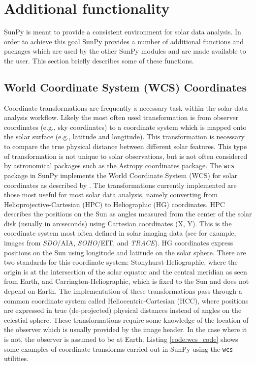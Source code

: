 \section{Additional functionality}\label{sec:util}
SunPy is meant to provide a consistent environment for solar data analysis. In 
order to achieve this goal SunPy provides a number of additional functions and packages which 
are used by the other SunPy modules and are made available to the user. This section 
briefly describes some of these functions.

	
\subsection{World Coordinate System (WCS) Coordinates}\label{ssec:util:wcs}
Coordinate transformations are frequently a necessary task within the solar 
data analysis workflow. Likely the most often used transformation is from 
observer coordinates (e.g., sky coordinates) to a coordinate system which is 
mapped onto the solar surface (e.g., latitude and longitude). This 
transformation is necessary to compare the true physical distance between 
different solar features. This type of transformation is not unique
to solar observations, but is not often considered by astronomical packages
such as the Astropy 
coordinates package. The \texttt{wcs} package in SunPy implements the World Coordinate 
System (WCS) for solar coordinates as described by \citep{thompson2006}. The 
transformations currently implemented are those most useful 
for most solar data analysis, namely converting from Helioprojective-Cartesian 
(HPC) to Heliographic (HG) coordinates. HPC describes the positions on 
the Sun as angles measured from the center of the solar disk (usually in 
arcseconds) using Cartesian coordinates (X, Y). This is the coordinate system 
most often defined in solar imaging data (see for example, images from 
\textit{SDO}/AIA, \textit{SOHO}/EIT, and \textit{TRACE}). 
HG coordinates express positions on the Sun using longitude and latitude on 
the solar sphere. There are two standards for this coordinate system:
Stonyhurst-Heliographic, where the origin is at the intersection of the solar 
equator and the central meridian as seen from Earth, and 
Carrington-Heliographic, which is fixed to the Sun and does not depend on Earth. The 
implementation of these transformations pass through a common coordinate system 
called Heliocentric-Cartesian (HCC), where positions are expressed in true 
(de-projected) physical distances instead of angles on the celestial sphere.
These transformations require some knowledge of the location of the observer 
which is usually provided by the image header. In the case where it is 
not, the observer is assumed to be at Earth. Listing \ref{code:wcs_code} shows 
some examples of coordinate transforms carried out in SunPy using the 
\texttt{wcs} utilities. 

